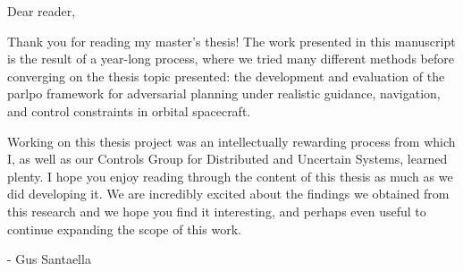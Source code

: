 \begin{preface}		%

Dear reader,

Thank you for reading my master's thesis! The work presented in this manuscript is the result of a year-long process, where we tried many different methods before converging on the thesis topic presented: the development and evaluation of the \acs{parlpo} framework for adversarial planning under realistic guidance, navigation, and control constraints in orbital spacecraft.

Working on this thesis project was an intellectually rewarding process from which I, as well as our Controls Group for Distributed and Uncertain Systems, learned plenty. I hope you enjoy reading through the content of this thesis as much as we did developing it. We are incredibly excited about the findings we obtained from this research and we hope you find it interesting, and perhaps even useful to continue expanding the scope of this work.

- Gus Santaella
\end{preface}

%
\utabstract

\tableofcontents   %

\listoftables      %
\listoffigures     %

\begin{glossary}

\end{glossary}



%
%

